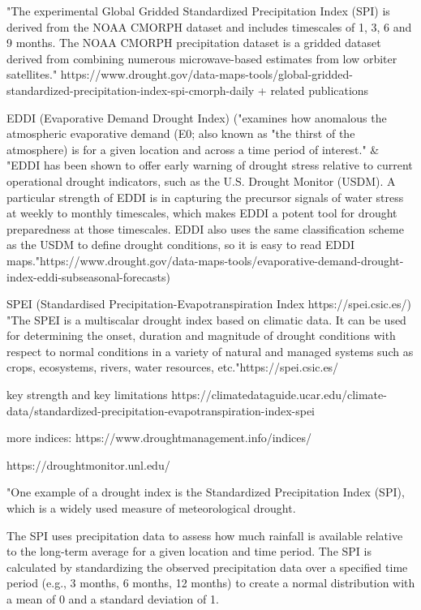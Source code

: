{"The experimental Global Gridded Standardized Precipitation Index (SPI) is derived from the NOAA CMORPH dataset and includes timescales of 1, 3, 6 and 9 months.  The NOAA CMORPH precipitation dataset is a gridded dataset derived from combining numerous microwave-based estimates from low orbiter satellites." https://www.drought.gov/data-maps-tools/global-gridded-standardized-precipitation-index-spi-cmorph-daily + related publications

EDDI (Evaporative Demand Drought Index) ("examines how anomalous the atmospheric evaporative demand (E0; also known as "the thirst of the atmosphere) is for a given location and across a time period of interest." \& "EDDI has been shown to offer early warning of drought stress relative to current operational drought indicators, such as the U.S. Drought Monitor (USDM). A particular strength of EDDI is in capturing the precursor signals of water stress at weekly to monthly timescales, which makes EDDI a potent tool for drought preparedness at those timescales. EDDI also uses the same classification scheme as the USDM to define drought conditions, so it is easy to read EDDI maps."https://www.drought.gov/data-maps-tools/evaporative-demand-drought-index-eddi-subseasonal-forecasts)

SPEI (Standardised Precipitation-Evapotranspiration Index https://spei.csic.es/)
"The SPEI is a multiscalar drought index based on climatic data. It can be used for determining the onset, duration and magnitude of drought conditions with respect to normal conditions in a variety of natural and managed systems such as crops, ecosystems, rivers, water resources, etc."https://spei.csic.es/

key strength and key limitations https://climatedataguide.ucar.edu/climate-data/standardized-precipitation-evapotranspiration-index-spei


more indices: https://www.droughtmanagement.info/indices/

https://droughtmonitor.unl.edu/


"One example of a drought index is the Standardized Precipitation Index (SPI), which is a widely used measure of meteorological drought.

The SPI uses precipitation data to assess how much rainfall is available relative to the long-term average for a given location and time period. The SPI is calculated by standardizing the observed precipitation data over a specified time period (e.g., 3 months, 6 months, 12 months) to create a normal distribution with a mean of 0 and a standard deviation of 1.

}
